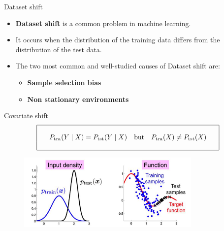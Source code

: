 \begin{frame}{Dataset shift}
	\begin{itemize}
		\item \textbf{Dataset shift} is a common problem in machine learning.
		
		\item It occurs when the distribution of the training data differs from the distribution of the test data.
		
		\item The two most common and well-studied causes of Dataset shift are:
		
		\begin{itemize}
			\item \textbf{Sample selection bias} %
			
			\item \textbf{Non stationary environments} %
		\end{itemize}

	\end{itemize}
	
	
\end{frame} 


\begin{frame}{Covariate shift}
	\vspace{0.3cm}
	$$	
	\begin{array}{|ccc|}
		\hline
		\ & & \\
		\ & P_{\text{tra}}(Y \mid X) = P_{\text{tst}}(Y \mid X) \quad \text{but} \quad P_{\text{tra}}(X) \neq P_{\text{tst}}(X) & \ \\
		\ & & \\
		\hline
	\end{array}
	$$
	
	\begin{figure}[H]
		\centering
		\includegraphics[width=9cm]{../assets/immagine.png}
		\label{fig:immagine}
	\end{figure}
\end{frame}

